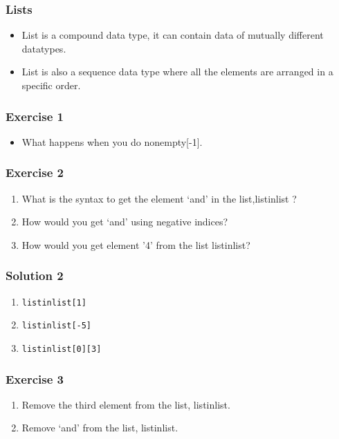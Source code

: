 \documentclass[17pt]{beamer}
\begin{document}
\begin{frame}
\frametitle{Lists}
\begin{itemize}
\item List is a compound data type, it can contain data of mutually
different datatypes.\pause
\item List is also a sequence data type where all the
elements are arranged in a specific order.
\end{itemize}
\end{frame}
\begin{frame}
\frametitle{Exercise 1}
\begin{itemize}
\item What happens when you do nonempty[-1].
\end{itemize}
\end{frame}
\begin{frame}
\frametitle{Exercise 2}
\begin{enumerate}
\item What is the syntax to get the element `and' in the list,listinlist ?\pause
\item How would you get `and' using negative indices?\pause
\item How would you get element '4' from the list listinlist?
\end{enumerate}
\end{frame}
\begin{frame}[fragile]
\frametitle{Solution 2}
\begin{enumerate}
\item \texttt{listinlist[1]}
\item \texttt{listinlist[-5]}
\item \texttt{listinlist[0][3]}
\end{enumerate}
\end{frame}
\begin{frame}
\frametitle{Exercise 3}
\begin{enumerate}
\item Remove the third element from the list, listinlist.\pause
\item Remove `and' from the list, listinlist.
\end{enumerate}
\end{frame}
\end{document}
